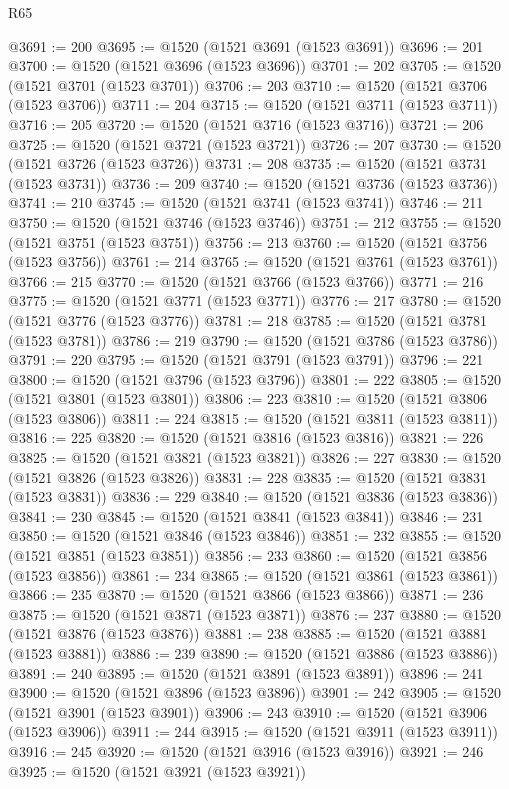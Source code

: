 \begin{lexlean}{R65}
\begin{coremodule}
{@3691 := 200
@3695 := @1520 (@1521 @3691 (@1523 @3691))
@3696 := 201
@3700 := @1520 (@1521 @3696 (@1523 @3696))
@3701 := 202
@3705 := @1520 (@1521 @3701 (@1523 @3701))
@3706 := 203
@3710 := @1520 (@1521 @3706 (@1523 @3706))
@3711 := 204
@3715 := @1520 (@1521 @3711 (@1523 @3711))
@3716 := 205
@3720 := @1520 (@1521 @3716 (@1523 @3716))
@3721 := 206
@3725 := @1520 (@1521 @3721 (@1523 @3721))
@3726 := 207
@3730 := @1520 (@1521 @3726 (@1523 @3726))
@3731 := 208
@3735 := @1520 (@1521 @3731 (@1523 @3731))
@3736 := 209
@3740 := @1520 (@1521 @3736 (@1523 @3736))
@3741 := 210
@3745 := @1520 (@1521 @3741 (@1523 @3741))
@3746 := 211
@3750 := @1520 (@1521 @3746 (@1523 @3746))
@3751 := 212
@3755 := @1520 (@1521 @3751 (@1523 @3751))
@3756 := 213
@3760 := @1520 (@1521 @3756 (@1523 @3756))
@3761 := 214
@3765 := @1520 (@1521 @3761 (@1523 @3761))
@3766 := 215
@3770 := @1520 (@1521 @3766 (@1523 @3766))
@3771 := 216
@3775 := @1520 (@1521 @3771 (@1523 @3771))
@3776 := 217
@3780 := @1520 (@1521 @3776 (@1523 @3776))
@3781 := 218
@3785 := @1520 (@1521 @3781 (@1523 @3781))
@3786 := 219
@3790 := @1520 (@1521 @3786 (@1523 @3786))
@3791 := 220
@3795 := @1520 (@1521 @3791 (@1523 @3791))
@3796 := 221
@3800 := @1520 (@1521 @3796 (@1523 @3796))
@3801 := 222
@3805 := @1520 (@1521 @3801 (@1523 @3801))
@3806 := 223
@3810 := @1520 (@1521 @3806 (@1523 @3806))
@3811 := 224
@3815 := @1520 (@1521 @3811 (@1523 @3811))
@3816 := 225
@3820 := @1520 (@1521 @3816 (@1523 @3816))
@3821 := 226
@3825 := @1520 (@1521 @3821 (@1523 @3821))
@3826 := 227
@3830 := @1520 (@1521 @3826 (@1523 @3826))
@3831 := 228
@3835 := @1520 (@1521 @3831 (@1523 @3831))
@3836 := 229
@3840 := @1520 (@1521 @3836 (@1523 @3836))
@3841 := 230
@3845 := @1520 (@1521 @3841 (@1523 @3841))
@3846 := 231
@3850 := @1520 (@1521 @3846 (@1523 @3846))
@3851 := 232
@3855 := @1520 (@1521 @3851 (@1523 @3851))
@3856 := 233
@3860 := @1520 (@1521 @3856 (@1523 @3856))
@3861 := 234
@3865 := @1520 (@1521 @3861 (@1523 @3861))
@3866 := 235
@3870 := @1520 (@1521 @3866 (@1523 @3866))
@3871 := 236
@3875 := @1520 (@1521 @3871 (@1523 @3871))
@3876 := 237
@3880 := @1520 (@1521 @3876 (@1523 @3876))
@3881 := 238
@3885 := @1520 (@1521 @3881 (@1523 @3881))
@3886 := 239
@3890 := @1520 (@1521 @3886 (@1523 @3886))
@3891 := 240
@3895 := @1520 (@1521 @3891 (@1523 @3891))
@3896 := 241
@3900 := @1520 (@1521 @3896 (@1523 @3896))
@3901 := 242
@3905 := @1520 (@1521 @3901 (@1523 @3901))
@3906 := 243
@3910 := @1520 (@1521 @3906 (@1523 @3906))
@3911 := 244
@3915 := @1520 (@1521 @3911 (@1523 @3911))
@3916 := 245
@3920 := @1520 (@1521 @3916 (@1523 @3916))
@3921 := 246
@3925 := @1520 (@1521 @3921 (@1523 @3921))
}
\end{coremodule}
\end{lexlean}
